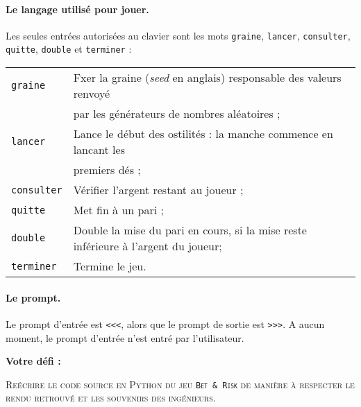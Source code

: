 \documentclass{article}
\begin{document}
\paragraph{Le langage utilisé pour jouer.} Les seules entrées autorisées au clavier sont les mots
{\tt graine}, {\tt lancer}, {\tt consulter}, {\tt quitte}, {\tt double} et {\tt terminer} :
\begin{center}
	\begin{tabular}{ll}
		{\tt graine}			&	Fxer la graine (\emph{seed} en anglais) responsable des valeurs renvoyé
		\\
								&	par les générateurs de nombres aléatoires ;
		\\
		{\tt lancer}		&	Lance le début des ostilités : la manche commence en lancant les
		\\
								&	premiers dés ;
		\\
		{\tt consulter}	&	Vérifier l'argent restant au joueur ;	
		\\
		{\tt quitte}			&	Met fin à un pari ;
		\\
		{\tt double}		&	Double la mise du pari en cours, si la mise reste inférieure à l'argent du joueur;
		\\
		{\tt terminer}		&	Termine le jeu.
	\end{tabular}
\end{center}


\paragraph{Le prompt.} Le prompt d'entrée est {\tt <}{\tt <}{\tt <}, alors que le prompt de sortie est {\tt >}{\tt >}{\tt >}.
A aucun moment, le prompt d'entrée n'est entré par l'utilisateur.


\bigskip
\null
\bigskip
\null
\bigskip


\noindent
\textbf{Votre défi :}

\bigskip

\begin{center}
	\begin{minipage}{10cm}
		\textsc	{Reécrire le code source en Python du jeu {\tt Bet \& Risk} de manière à respecter
					le rendu retrouvé et les souvenirs des ingénieurs.}
	\end{minipage}
\end{center}

\bigskip
\null
\bigskip





\newpage
\end{document}
